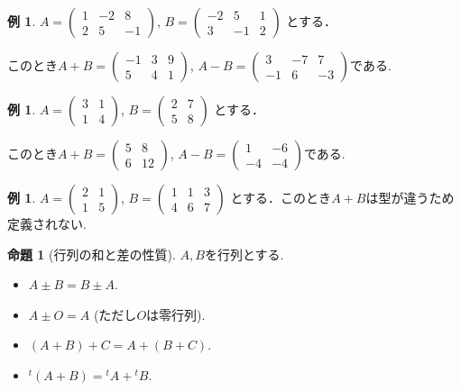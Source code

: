 \documentclass[dvipdfmx,a4paper,11pt]{article}
\theoremstyle{definition}
\newtheorem{prop}[thm]{命題}
\newtheorem{exa}[thm]{例}
\begin{document}
 \begin{exa}
 $A = 
 \begin{pmatrix}
 1 &-2&8 \\
 2&5&-1
 \end{pmatrix}
 $, 
 $
 B = 
 \begin{pmatrix}
 -2&5&1 \\
 3&-1&2
 \end{pmatrix}
 $
 とする．
 
 このとき$
 A+B =
 \begin{pmatrix}
 -1 &3&9 \\
 5&4&1
 \end{pmatrix}
 $, 
 $
  A-B =
 \begin{pmatrix}
 3 &-7&7 \\
 -1&6&-3
 \end{pmatrix}
 $である.
 \end{exa}

\begin{exa}
 $A = 
 \begin{pmatrix}
 3&1 \\
 1&4
 \end{pmatrix}
 $, 
 $
 B = 
 \begin{pmatrix}
 2&7\\
 5&8
 \end{pmatrix}
 $
 とする．
 
 このとき$
 A+B =
 \begin{pmatrix}
 5&8 \\
6&12
 \end{pmatrix}
 $, 
 $
  A-B =
 \begin{pmatrix}
 1&-6 \\
 -4&-4
 \end{pmatrix}
 $である.
 \end{exa}
 
 \begin{exa}
 $A = 
 \begin{pmatrix}
 2&1 \\
 1&5
 \end{pmatrix}
 $,
$ 
 B = 
 \begin{pmatrix}
 1&1 &3 \\
 4&6 & 7
 \end{pmatrix}
 $
 とする．このとき$A+B$は型が違うため定義されない. 
 \end{exa}
 
 \begin{tcolorbox}[
    colback = white,
    colframe = green!35!black,
    fonttitle = \bfseries,
    breakable = true]
    \begin{prop}[行列の和と差の性質]
$A, B$を行列とする.
 \begin{itemize}
   \setlength{\parskip}{0cm} 
  \setlength{\itemsep}{0cm}
 \item $A\pm B =B\pm A$.
  \item $A\pm O =A$ (ただし$O$は零行列).
  \item $(A+B)+C =A + (B+C)$.
  \item ${}^{t}(A+B) = {}^{t}A+ {}^{t}B$.
 \end{itemize}
  \end{prop}
 \end{tcolorbox}
 
\end{document}
